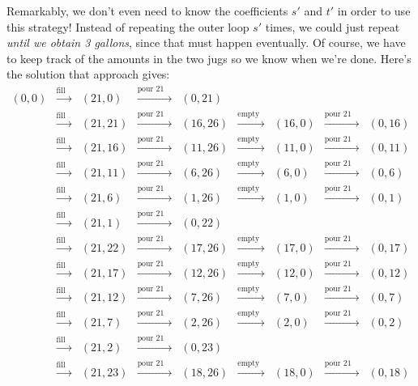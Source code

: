 Remarkably, we don't even need to know the coefficients $s'$ and $t'$
in order to use this strategy!  Instead of repeating the outer loop
$s'$ times, we could just repeat \emph{until we obtain 3 gallons},  
since that must happen eventually.  Of course, we have to keep track
of the amounts in the two jugs so we know when we're done.  Here's the
solution that approach gives:
%
\[
\begin{array}{ccccccccc}
(0,0) & \xrightarrow{\text{fill 21}} & (21,0)& \xrightarrow{\text{pour 21 into 26}} & (0,21)\\
& \xrightarrow{\text{fill 21}} & (21,21)& \xrightarrow{\text{pour 21 into 26}} & (16,26)& \xrightarrow{\text{empty 26}} & (16,0)& \xrightarrow{\text{pour 21 into 26}} & (0,16)\\
& \xrightarrow{\text{fill 21}} & (21,16)& \xrightarrow{\text{pour 21 into 26}} & (11,26)& \xrightarrow{\text{empty 26}} & (11,0)& \xrightarrow{\text{pour 21 into 26}} & (0,11)\\
& \xrightarrow{\text{fill 21}} & (21,11)& \xrightarrow{\text{pour 21 into 26}} & (6,26)& \xrightarrow{\text{empty 26}} & (6,0)& \xrightarrow{\text{pour 21 into 26}} & (0,6)\\
& \xrightarrow{\text{fill 21}} & (21,6)& \xrightarrow{\text{pour 21 into 26}} & (1,26)& \xrightarrow{\text{empty 26}} & (1,0)& \xrightarrow{\text{pour 21 into 26}} & (0,1)\\
& \xrightarrow{\text{fill 21}} & (21,1)& \xrightarrow{\text{pour 21 into 26}} & (0,22)\\
& \xrightarrow{\text{fill 21}} & (21,22)& \xrightarrow{\text{pour 21 into 26}} & (17,26)& \xrightarrow{\text{empty 26}} & (17,0)& \xrightarrow{\text{pour 21 into 26}} & (0,17)\\
& \xrightarrow{\text{fill 21}} & (21,17)& \xrightarrow{\text{pour 21 into 26}} & (12,26)& \xrightarrow{\text{empty 26}} & (12,0)& \xrightarrow{\text{pour 21 into 26}} & (0,12)\\
& \xrightarrow{\text{fill 21}} & (21,12)& \xrightarrow{\text{pour 21 into 26}} & (7,26)& \xrightarrow{\text{empty 26}} & (7,0)& \xrightarrow{\text{pour 21 into 26}} & (0,7)\\
& \xrightarrow{\text{fill 21}} & (21,7)& \xrightarrow{\text{pour 21 into 26}} & (2,26)& \xrightarrow{\text{empty 26}} & (2,0)& \xrightarrow{\text{pour 21 into 26}} & (0,2)\\
& \xrightarrow{\text{fill 21}} & (21,2)& \xrightarrow{\text{pour 21 into 26}} & (0,23)\\
& \xrightarrow{\text{fill 21}} & (21,23)& \xrightarrow{\text{pour 21 into 26}} & (18,26)& \xrightarrow{\text{empty 26}} & (18,0)& \xrightarrow{\text{pour 21 into 26}} & (0,18)\\

\end{array}\]
